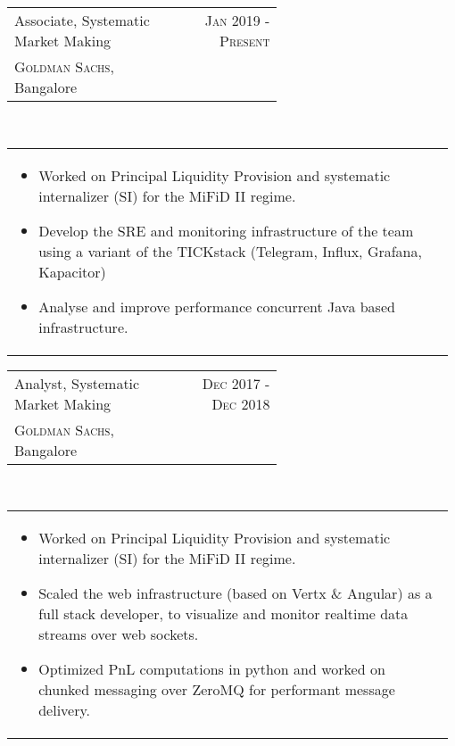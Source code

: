 \documentclass[a4paper]{article} %
\newcommand{\verticalspacing}{-0.25cm}
\newcommand{\bulletspace}{0.7cm}
\newcommand{\projectheadspacing}{6.9cm}
\newcommand{\cproject}[5]{%
    \begin{tabular}{p{0.60\linewidth}r}
        \textcolor{NavyBlue}{\small #2} & \multicolumn{1}{m{ \projectheadspacing{} }}{\raggedleft \small {\textsc{#1}}}\\
        \small {#3} & \small {#4}
    \end{tabular}\\
    \begin{tabular}{p{0.98\linewidth}}
    \vspace{-0.3cm}
        \small{#5}
    \end{tabular}
    \vspace{\verticalspacing{}}
}
\begin{document}
\cproject
      {Jan 2019 - Present}
      {Associate, Systematic Market Making}
      {\textsc{Goldman Sachs}, Bangalore}
      {}
      {%
        \begin{itemize}[leftmargin=\bulletspace{}]
          \item Worked on Principal Liquidity Provision and systematic internalizer (SI) for the MiFiD II regime.
          \item Develop the SRE and monitoring infrastructure of the team using a variant of the TICKstack (Telegram, Influx, Grafana, Kapacitor)
          \item Analyse and improve performance concurrent Java based infrastructure.
        \end{itemize}
      }

\cproject
      {Dec 2017 - Dec 2018}
      {Analyst, Systematic Market Making}
      {\textsc{Goldman Sachs}, Bangalore}
      {}
      {%
        \begin{itemize}[leftmargin=\bulletspace{}]
          \item Worked on Principal Liquidity Provision and systematic internalizer (SI) for the MiFiD II regime.
          \item Scaled the web infrastructure (based on Vertx \& Angular) as a full stack developer, to visualize
                and monitor realtime data streams over web sockets.
          \item Optimized PnL computations in python and worked on chunked messaging over ZeroMQ for performant
                message delivery.
        \end{itemize}
      }
\end{document}
